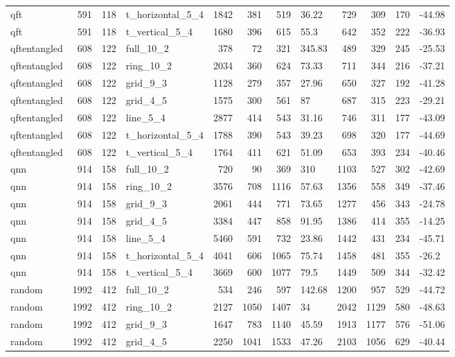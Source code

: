 \begin{longtable}{lrrlrrrlrrrl}
qft & 591 & 118 & t\_horizontal\_5\_4 & 1842 & 381 & 519 & 36.22 & 729 & 309 & 170 & -44.98 \\
qft & 591 & 118 & t\_vertical\_5\_4 & 1680 & 396 & 615 & 55.3 & 642 & 352 & 222 & -36.93 \\
qftentangled & 608 & 122 & full\_10\_2 & 378 & 72 & 321 & 345.83 & 489 & 329 & 245 & -25.53 \\
qftentangled & 608 & 122 & ring\_10\_2 & 2034 & 360 & 624 & 73.33 & 711 & 344 & 216 & -37.21 \\
qftentangled & 608 & 122 & grid\_9\_3 & 1128 & 279 & 357 & 27.96 & 650 & 327 & 192 & -41.28 \\
qftentangled & 608 & 122 & grid\_4\_5 & 1575 & 300 & 561 & 87 & 687 & 315 & 223 & -29.21 \\
qftentangled & 608 & 122 & line\_5\_4 & 2877 & 414 & 543 & 31.16 & 746 & 311 & 177 & -43.09 \\
qftentangled & 608 & 122 & t\_horizontal\_5\_4 & 1788 & 390 & 543 & 39.23 & 698 & 320 & 177 & -44.69 \\
qftentangled & 608 & 122 & t\_vertical\_5\_4 & 1764 & 411 & 621 & 51.09 & 653 & 393 & 234 & -40.46 \\
qnn & 914 & 158 & full\_10\_2 & 720 & 90 & 369 & 310 & 1103 & 527 & 302 & -42.69 \\
qnn & 914 & 158 & ring\_10\_2 & 3576 & 708 & 1116 & 57.63 & 1356 & 558 & 349 & -37.46 \\
qnn & 914 & 158 & grid\_9\_3 & 2061 & 444 & 771 & 73.65 & 1277 & 456 & 343 & -24.78 \\
qnn & 914 & 158 & grid\_4\_5 & 3384 & 447 & 858 & 91.95 & 1386 & 414 & 355 & -14.25 \\
qnn & 914 & 158 & line\_5\_4 & 5460 & 591 & 732 & 23.86 & 1442 & 431 & 234 & -45.71 \\
qnn & 914 & 158 & t\_horizontal\_5\_4 & 4041 & 606 & 1065 & 75.74 & 1458 & 481 & 355 & -26.2 \\
qnn & 914 & 158 & t\_vertical\_5\_4 & 3669 & 600 & 1077 & 79.5 & 1449 & 509 & 344 & -32.42 \\
random & 1992 & 412 & full\_10\_2 & 534 & 246 & 597 & 142.68 & 1200 & 957 & 529 & -44.72 \\
random & 1992 & 412 & ring\_10\_2 & 2127 & 1050 & 1407 & 34 & 2042 & 1129 & 580 & -48.63 \\
random & 1992 & 412 & grid\_9\_3 & 1647 & 783 & 1140 & 45.59 & 1913 & 1177 & 576 & -51.06 \\
random & 1992 & 412 & grid\_4\_5 & 2250 & 1041 & 1533 & 47.26 & 2103 & 1056 & 629 & -40.44 \\

\end{longtable}
